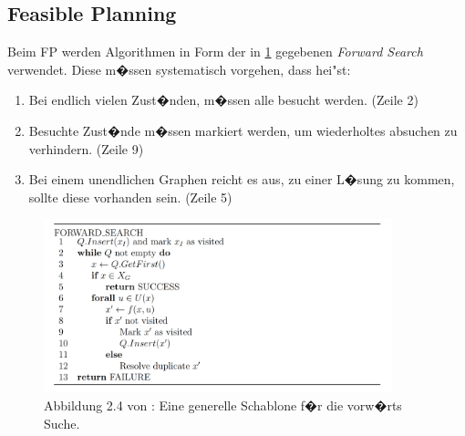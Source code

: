 

%

\subsection {Feasible Planning} %
Beim FP werden Algorithmen in Form der in \ref{lav04} gegebenen \textit{Forward Search} verwendet. Diese m�ssen systematisch vorgehen, dass hei"st:
\begin{enumerate}
	\item Bei endlich vielen Zust�nden, m�ssen alle besucht werden. (Zeile 2)
	\item Besuchte Zust�nde m�ssen markiert werden, um wiederholtes absuchen zu verhindern. (Zeile 9)
	\item Bei einem unendlichen Graphen reicht es aus, zu einer L�sung zu kommen, sollte diese vorhanden sein. (Zeile 5)
\end{enumerate} \cite[~S. 32]{Lav06}
\begin{figure}
	\centering
	\includegraphics[width=0.9\textwidth]{images/img225.png}
	\caption{Abbildung 2.4 von \cite[~S. 33]{Lav06}:  Eine generelle Schablone f�r die vorw�rts Suche.}
	\label{lav04}
\end{figure} 

